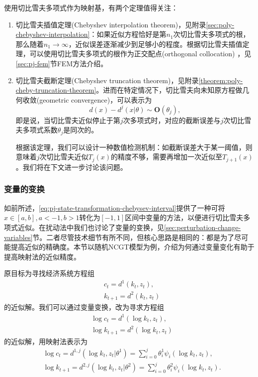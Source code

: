 使用切比雪夫多项式作为映射基，有两个定理值得关注：
\begin{enumerate}
  \item 切比雪夫插值定理(Chebyshev interpolation theorem)，见附录\ref{sec:poly-chebyshev-interpolation}：如果近似方程恰好是第$n_1$次切比雪夫多项式的根，那么随着$n_1 \rightarrow \infty$，近似误差逐渐减少到足够小的程度。根据切比雪夫插值定理，可以使用切比雪夫多项式的根作为正交配点(orthogonal collocation) ，见\ref{sec:pj-fem}节FEM方法介绍。
  \item 切比雪夫截断定理(Chebyshev truncation theorem)，见附录\ref{theorem:poly-cheby-truncation-theorem}。进而在特定情况下，切比雪夫向未知原方程做几何收敛(geometric convergence)，可以表示为
  \begin{equation*}
    d(x) - d^j(x | \theta) \sim \bm{O}(\theta_j),
  \end{equation*}
  即是说，当切比雪夫近似停止于第$j$次多项式时，对应的截断误差与$j$次切比雪夫多项式系数$\theta_j$是同次的。

  根据该定理，我们可以设计一种数值检测机制：如截断误差大于某一阈值，则意味着$j$次切比雪夫近似$T_j(x)$的精度不够，需要再增加一次近似至$T_{j+1}(x)$。我们将在下文进一步讨论该问题。
\end{enumerate}

\subsubsection{变量的变换}
\label{sec:pj-spectral-cheby-variable-change}

如前所述，\ref{eq:pj-state-transformation-chebysev-interval}提供了一种可将$x \in [a,b], a < -1, b > 1$转化为$[-1,1]$区间中变量的方法，以便进行切比雪夫多项式近似。在扰动法中我们也讨论了变量的变换，见\ref{sec:perturbation-change-variables}节。二者尽管技术细节有所不同，但核心思路是相同的：都是为了尽可能提高近似的精确度。本节以随机NCGT模型为例，介绍为何通过变量变化有助于提高映射法的近似精度。

原目标为寻找经济系统方程组
\begin{align*}
  &c_t = d^1(k_t,z_t), \\
  &k_{t+1} = d^2(k_t,z_t)
\end{align*}
的近似解。我们可以通过变量变换，改为寻求方程组
\begin{align*}
  &\log c_t = d^1(\log k_t, z_t),\\
  &\log k_{t+1} = d^2 (\log k_{t}, z_t)
\end{align*}
的近似解，用映射法表示为
\begin{align*}
  &\log c_t = d^{1,j}(\log k_t, z_t|\theta^1) = \sum_{i=0}^{j} \theta^1_i \psi_i (\log k_t, z_t),\\
  &\log k_{t+1} = d^{2,j} (\log k_{t}, z_t | \theta^2 ) = \sum_{i=0}^{j} \theta_i^2 \psi_i (\log k_t, z_t).
\end{align*}

